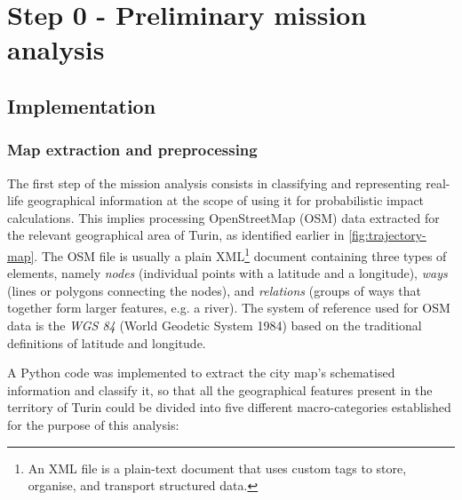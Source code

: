 \section{Step 0 - Preliminary mission analysis}\label{section:step0-mission-analysis}


\subsection{Implementation}

\subsubsection{Map extraction and preprocessing}

The first step of the mission analysis consists in classifying and representing real-life geographical information at the scope of using it for probabilistic impact calculations. This implies processing OpenStreetMap (OSM) data extracted for the relevant geographical area of Turin, as identified earlier in \cref{fig:trajectory-map}. The OSM file is usually a plain XML\footnote{An XML file is a plain-text document that uses custom tags to store, organise, and transport structured data.} document containing three types of elements, namely \textit{nodes} (individual points with a latitude and a longitude), \textit{ways} (lines or polygons connecting the nodes), and \textit{relations} (groups of ways that together form larger features, e.g. a river). The system of reference used for OSM data is the \textit{WGS 84} (World Geodetic System 1984) based on the traditional definitions of latitude and longitude.

A Python code was implemented to extract the city map's schematised information and classify it, so that all the geographical features present in the territory of Turin could be divided into five different macro-categories established for the purpose of this analysis:

